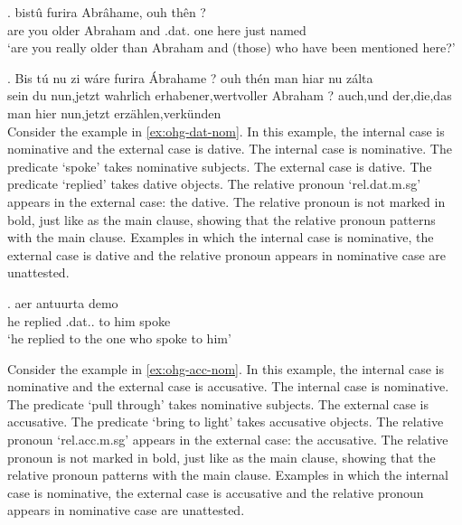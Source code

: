 \exg. bistû furira Abrâhame, ouh thên    ?\\
 {are you} older\scsub{[dat]} {Abraham} and .\ac{dat}. one here just named\scsub{[acc]}\\
 `are you really older than Abraham and (those) who have been mentioned here?' \label{ex:ohg-dat-acc}

\exg. Bis	tú	nu	{zi wáre}	furira	Ábrahame	?	ouh	thén	man	hiar	nu	zálta\\
sein	du	nun,jetzt	wahrlich	erhabener,wertvoller	Abraham	?	auch,und	der,die,das	man	hier	nun,jetzt	erzählen,verkünden\\



Consider the example in \ref{ex:ohg-dat-nom}. In this example, the internal case is nominative and the external case is dative.
The internal case is nominative. The predicate  `spoke' takes nominative subjects.
The external case is dative. The predicate  `replied' takes dative objects.
The relative pronoun  `\ac{rel}.\ac{dat}.\ac{m}.\ac{sg}' appears in the external case: the dative. The relative pronoun is not marked in bold, just like as the main clause, showing that the relative pronoun patterns with the main clause.
Examples in which the internal case is nominative, the external case is dative and the relative pronoun appears in nominative case are unattested.

\exg. aer antuurta demo  \\
 he replied\scsub{[dat]} .\ac{dat}.. {to him} spoke\scsub{[nom]}\\
 `he replied to the one who spoke to him' \label{ex:ohg-dat-nom}



Consider the example in \ref{ex:ohg-acc-nom}. In this example, the internal case is nominative and the external case is accusative.
The internal case is nominative. The predicate  `pull through' takes nominative subjects.
The external case is accusative. The predicate  `bring to light' takes accusative objects.
The relative pronoun  `\ac{rel}.\ac{acc}.\ac{m}.\ac{sg}' appears in the external case: the accusative. The relative pronoun is not marked in bold, just like as the main clause, showing that the relative pronoun patterns with the main clause.
Examples in which the internal case is nominative, the external case is accusative and the relative pronoun appears in nominative case are unattested.


